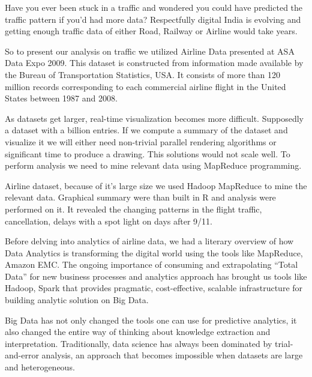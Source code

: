 Have you ever been stuck in a traffic and wondered you could have predicted the traffic pattern if you'd had more data? Respectfully digital India is evolving and getting enough traffic data of either Road, Railway or Airline would take years.

So to present our analysis on traffic we utilized Airline Data presented at ASA Data Expo 2009. This dataset is constructed from information made available by the Bureau of Transportation Statistics, USA. It consists of more than 120 million records corresponding to each commercial airline flight in the United States between 1987 and 2008\cite{dataexpo2009}.

As datasets get larger, real-time visualization becomes more difficult. Supposedly a dataset with a billion entries. If we compute a summary of the dataset and visualize it we will either need non-trivial parallel rendering algorithms or significant time to produce a drawing. This solutions would not scale well. To perform analysis we need to mine relevant data using MapReduce programming. 

Airline dataset, because of it's large size we used Hadoop MapReduce to mine the relevant data. Graphical summary were than built in R and analysis were performed on it. It revealed the changing patterns in the flight traffic, cancellation, delays with a spot light on days after 9/11. 

Before delving into analytics of airline data, we had a literary overview of how Data Analytics is transforming the digital world using the tools like MapReduce, Amazon EMC. The ongoing importance of consuming and extrapolating “Total Data” for new business processes and analytics approach has brought us tools like Hadoop, Spark that provides pragmatic, cost-effective, scalable infrastructure for building analytic solution on Big Data.

Big Data has not only changed the tools one can use for predictive analytics, it also changed the entire way of thinking about knowledge extraction and interpretation. Traditionally, data science has always been dominated by trial-and-error analysis, an approach that becomes impossible when datasets are large and heterogeneous.
     